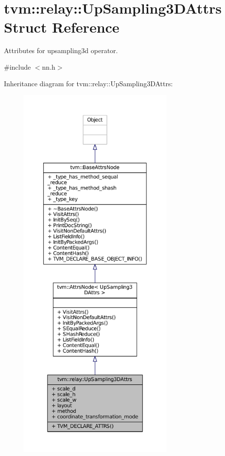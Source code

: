 \hypertarget{structtvm_1_1relay_1_1UpSampling3DAttrs}{}\section{tvm\+:\+:relay\+:\+:Up\+Sampling3\+D\+Attrs Struct Reference}
\label{structtvm_1_1relay_1_1UpSampling3DAttrs}


Attributes for upsampling3d operator.  




{\ttfamily \#include $<$nn.\+h$>$}



Inheritance diagram for tvm\+:\+:relay\+:\+:Up\+Sampling3\+D\+Attrs\+:
\nopagebreak
\begin{figure}[H]
\begin{center}
\leavevmode
\includegraphics[height=550pt]{structtvm_1_1relay_1_1UpSampling3DAttrs__inherit__graph}
\end{center}
\end{figure}


